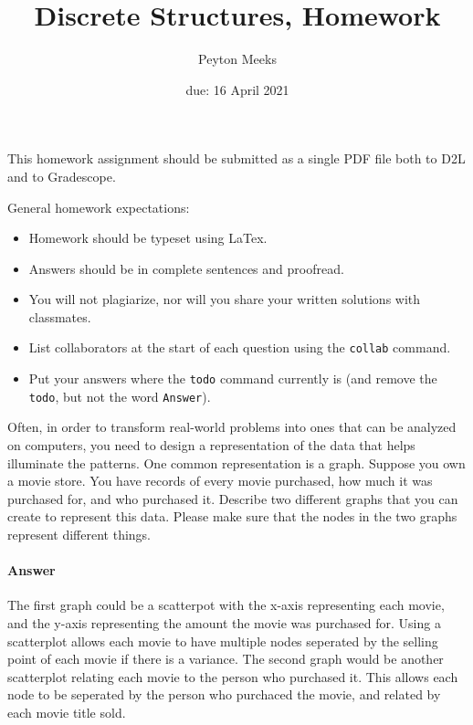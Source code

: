 \documentclass{article}
\title{Discrete Structures, Homework \hwnum}
\author{Peyton Meeks}
\date{due: 16 April 2021}
\begin{document}
\maketitle

This homework assignment should be
submitted as a single PDF file both to D2L and to Gradescope.

General homework expectations:
\begin{itemize}
    \item Homework should be typeset using LaTex.
    \item Answers should be in complete sentences and proofread.
    \item You will not plagiarize, nor will you share your written solutions
        with classmates.
    \item List collaborators at the start of each question using the \texttt{collab} command.
    \item Put your answers where the \texttt{todo} command currently is (and
        remove the \texttt{todo}, but not the word \texttt{Answer}).
\end{itemize}


 

Often, in order to transform real-world problems into ones that can be analyzed
on computers, you need to design a representation of the data that helps
illuminate the patterns.  One common representation is a graph.  Suppose you own
a movie store.  You have records of every movie purchased, how much it was
purchased for, and who purchased it.  Describe two different graphs that you can
create to represent this data.  Please make sure that the nodes in the two
graphs represent different things.

\paragraph{Answer}

The first graph could be a scatterpot with the x-axis representing each movie, and the y-axis representing the amount the movie was purchased for. Using a scatterplot allows each movie to have multiple nodes seperated by the selling point of each movie if there is a variance. The second graph would be another scatterplot relating each movie to the person who purchased it. This allows each node to be seperated by the person who purchaced the movie, and related by each movie title sold.
\end{document}
